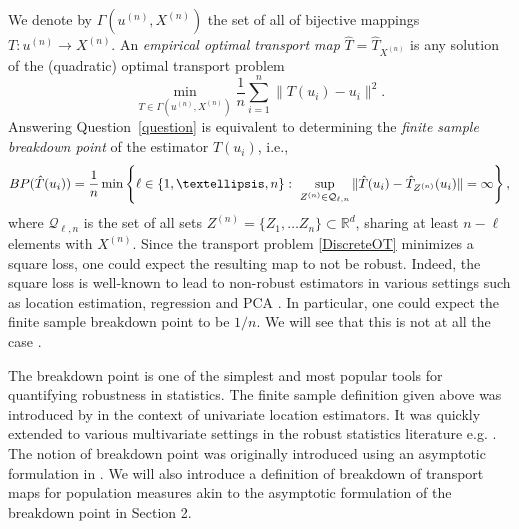 \documentclass[11pt]{article}
\newcommand{\R}{\mathbb{R}}
\theoremstyle{plain}
\theoremstyle{definition}
\begin{document}
We denote by $\Gamma(u^{(n)},X^{(n)} )$ the set of all of bijective mappings  $T: u^{(n)}\to X^{(n)}$. An {\it empirical optimal transport map} $\hat{T} =\hat{T}_{X^{(n)}}$ is any solution of the (quadratic) optimal transport problem  
\begin{equation}
    \label{DiscreteOT}
    \min_{T\in \Gamma(u^{(n)},X^{(n)} )}\frac{1}{n}\sum_{i=1}^n  \|T(u_i)-u_i\|^2. 
\end{equation}
%
Answering Question~\ref{question} is equivalent to determining the  {\it finite sample breakdown point} of the estimator  $\hat{T}(u_i)$, i.e.,  
 $${\rm BP}(\hat{T}(u_i))=\frac{1}{n} \min \left\{ \ell \in \{1, \dots, n\}: \ \sup_{Z^{(n)}\in \mathcal{Q}_{\ell,n}}  \|\hat{T}(u_i)-\hat{T}_{Z^{(n)}}(u_i)\|  = \infty\right \},
$$
where $\mathcal{Q}_{\ell,n}$ is the set of all sets $Z^{(n)}=\{Z_1, \dots Z_n\}\subset  \R^d $,  sharing  {at least} $n-\ell$ elements with $X^{(n)}$.  { Since the transport problem \eqref{DiscreteOT} minimizes a square loss, one could expect the resulting map to not be robust. Indeed, the square loss is well-known to lead to non-robust estimators in various settings such as location estimation, regression and PCA \cite{hampeletal1986,huber:ronchetti2009,maronnaetal2019}. In particular, one could expect the finite sample breakdown point to be $1/n$.  We will see that this is not at all the case {.} }

The breakdown point is one of the simplest and most popular tools for quantifying  robustness in statistics. The finite sample definition given above was introduced by \cite{donoho:huber1983} in the context of univariate location estimators. It was quickly extended to various multivariate settings in the robust statistics literature e.g. \cite{rousseeuw:yohai1984,rousseeuw1984,davies1987,yohai1987}. The notion of breakdown point was originally introduced using an asymptotic formulation in \cite{hampel1968,hampel1971}. We will also introduce a definition of breakdown of transport maps for population measures akin to the asymptotic formulation of the breakdown point in Section 2.
\end{document}
